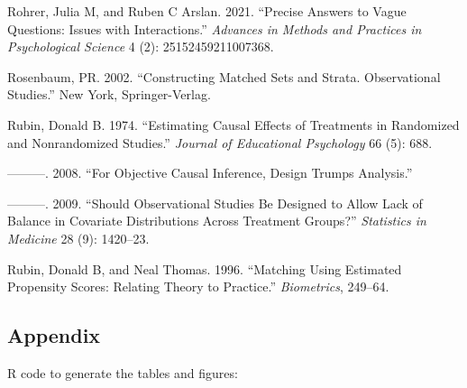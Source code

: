\documentclass[
  letterpaper,
  DIV=11,
  numbers=noendperiod]{scrartcl}
\newlength{\cslhangindent}
\newlength{\cslentryspacingunit} %
\newenvironment{CSLReferences}[2] %
 {%
  \setlength{\parindent}{0pt}
  \ifodd #1
  \let\oldpar\par
  \def\par{\hangindent=\cslhangindent\oldpar}
  \fi
  \setlength{\parskip}{#2\cslentryspacingunit}
 }%
 {}
\begin{document}
\begin{CSLReferences}{1}{0}
\leavevmode{}%
Rohrer, Julia M, and Ruben C Arslan. 2021. {``Precise Answers to Vague
Questions: Issues with Interactions.''} \emph{Advances in Methods and
Practices in Psychological Science} 4 (2): 25152459211007368.

\leavevmode{}%
Rosenbaum, PR. 2002. {``Constructing Matched Sets and Strata.
Observational Studies.''} New York, Springer-Verlag.

\leavevmode{}%
Rubin, Donald B. 1974. {``Estimating Causal Effects of Treatments in
Randomized and Nonrandomized Studies.''} \emph{Journal of Educational
Psychology} 66 (5): 688.

\leavevmode{}%
---------. 2008. {``For Objective Causal Inference, Design Trumps
Analysis.''}

\leavevmode{}%
---------. 2009. {``Should Observational Studies Be Designed to Allow
Lack of Balance in Covariate Distributions Across Treatment Groups?''}
\emph{Statistics in Medicine} 28 (9): 1420--23.

\leavevmode{}%
Rubin, Donald B, and Neal Thomas. 1996. {``Matching Using Estimated
Propensity Scores: Relating Theory to Practice.''} \emph{Biometrics},
249--64.

\end{CSLReferences}

\hypertarget{appendix}{%
\subsection{Appendix}\label{appendix}}

R code to generate the tables and figures:
\end{document}
